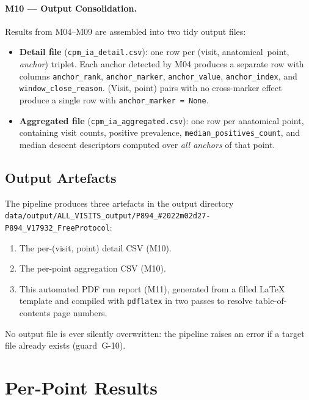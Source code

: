 \documentclass[a4paper,11pt]{article}
\begin{document}
\paragraph{M10 --- Output Consolidation.}
Results from M04--M09 are assembled into two tidy output files:
\begin{itemize}
  \item \textbf{Detail file} (\texttt{cpm\_ia\_detail.csv}): one row per
        (visit, anatomical~point, \emph{anchor}) triplet. Each anchor detected by M04
        produces a separate row with columns \texttt{anchor\_rank},
        \texttt{anchor\_marker}, \texttt{anchor\_value}, \texttt{anchor\_index},
        and \texttt{window\_close\_reason}.
        (Visit, point) pairs with no cross-marker effect produce a single row with
        \texttt{anchor\_marker = None}.
  \item \textbf{Aggregated file} (\texttt{cpm\_ia\_aggregated.csv}): one row per
        anatomical point, containing visit counts, positive prevalence,
        \texttt{median\_positives\_count}, and median descent descriptors computed over
        \emph{all anchors} of that point.
\end{itemize}

\subsection{Output Artefacts}

The pipeline produces three artefacts in the output directory \texttt{data/output/ALL\_VISITS\_output/P894\_\#2022m02d27-P894\_V17932\_FreeProtocol}:
\begin{enumerate}
  \item The per-(visit, point) detail CSV (M10).
  \item The per-point aggregation CSV (M10).
  \item This automated PDF run report (M11), generated from a filled \LaTeX{} template
        and compiled with \texttt{pdflatex} in two passes to resolve table-of-contents
        page numbers.
\end{enumerate}
No output file is ever silently overwritten: the pipeline raises an error if a target
file already exists (guard~G-10).

\section{Per-Point Results}
\end{document}
